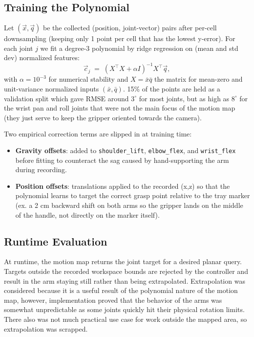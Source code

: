 \subsection{Training the Polynomial}
\label{sec:mm-training}
Let $(\vec{x},\vec{q})$ be the collected
(position, joint-vector) pairs after per-cell
downsampling (keeping only 1 point per cell that has the lowest y-error). For each joint $j$ we fit a degree-3 polynomial by ridge regression on (mean and std dev) normalized features:
\begin{equation}
\label{eq:motion map fit}
  \vec{c}_j \;=\; (X^\top X + \alpha I)^{-1} X^\top \vec{q},
\end{equation}
with $\alpha = 10^{-3}$ for numerical stability and
$X=\bar{x}\bar{q}$ the matrix for mean-zero and unit-variance normalized inputs
$(\bar{x},\bar{q})$. 15\% of the points are held as a validation split which gave
RMSE around $3^\circ$ for most joints, but as high as $8^\circ$
for the wrist pan and roll joints that were not the main focus of the motion map (they just serve to keep the gripper oriented towards the camera).


Two empirical correction terms are slipped in at training time:
\begin{itemize}
  \item \textbf{Gravity offsets}: added to
  \texttt{shoulder\_lift}, \texttt{elbow\_flex}, and \texttt{wrist\_flex}
  before fitting to counteract the sag caused by hand-supporting the
  arm during recording.
  \item \textbf{Position offsets}:
  translations applied to the recorded (x,z)
  so that the polynomial learns to target the correct grasp point
  relative to the tray marker (ex. a 2 cm backward shift on both arms so the gripper lands on the middle of the handle, not directly on the marker
  itself).
\end{itemize}

\subsection{Runtime Evaluation}
At runtime, the motion map returns the joint target for a
desired planar query. Targets outside the recorded workspace bounds are rejected by the controller and result in the arm staying still rather than being extrapolated. Extrapolation was considered because it is a useful result of the polynomial nature of the motion map, however, implementation proved that the behavior of the arms was somewhat unpredictable as some joints quickly hit their physical rotation limits. There also was not much practical use case for work outside the mapped area, so extrapolation was scrapped.

